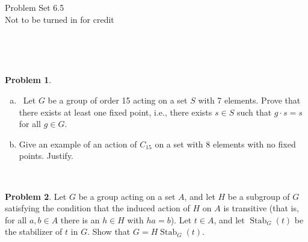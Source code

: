 \documentclass[11pt]{article}
\title{}
\date{\vspace{-0.5in}}
\DeclareMathOperator{\Stab}{Stab}
\theoremstyle{definition}
\newtheorem{problem}{Problem}
\begin{document}
\thispagestyle{fancy}
\pagestyle{fancy}

\vspace{3em}

\begin{center}
	{\LARGE Problem Set 6.5 \\}
	Not to be turned in for credit
\end{center}

\

\noindent




\

\begin{problem}
\begin{enumerate}[(a)]
\item Let $G$ be a group of order 15 acting on a set $S$ with 7 elements. Prove that there exists at least one fixed point, i.e., there exists $s\in S$ such that $g\cdot s=s$ for all $g\in G$.
\item Give an example of an action of $C_{15}$ on a set with 8 elements with no fixed points. Justify. 
\end{enumerate}
\end{problem} 


\


\begin{problem} Let $G$ be a group acting on a set $A$, and let $H$ be a subgroup of $G$ satisfying the condition that the induced action of $H$ on $A$ is transitive
  (that is, for all $a,b \in A$ there is an $h \in H$ with $ha=b$). Let $t \in A$, and let $\Stab_G(t)$ be the stabilizer of $t$ in $G$. Show that $G = H \Stab_G(t)$.
\end{problem}
\end{document}
